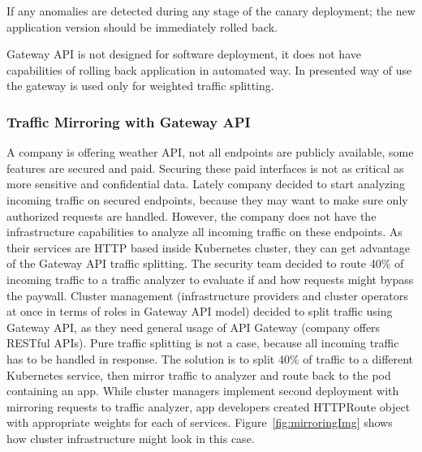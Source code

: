 If any anomalies are detected during any stage of the canary deployment; the new application version should be immediately rolled back.

Gateway API is not designed for software deployment, it does not have capabilities of rolling back application in automated way. In presented way of use the gateway is used only for weighted traffic splitting.


\subsubsection{Traffic Mirroring with Gateway API}
\label{subsubsection:mirroring}

A company is offering weather API, not all endpoints are publicly available, some features are secured and paid. Securing these paid interfaces is not as critical as more sensitive and confidential data. Lately company decided to start analyzing incoming traffic on secured endpoints, because they may want to make sure only authorized requests are handled. However, the company does not have the infrastructure capabilities to analyze all incoming traffic on these endpoints. As their services are HTTP based inside Kubernetes cluster, they can get advantage of the Gateway API traffic splitting. The security team decided to route 40\% of incoming traffic to a traffic analyzer to evaluate if and how requests might bypass the paywall. Cluster management (infrastructure providers and cluster operators at once in terms of roles in Gateway API model) decided to split traffic using Gateway API, as they need general usage of API Gateway (company offers RESTful APIs). Pure traffic splitting is not a case, because all incoming traffic has to be handled in response. The solution is to split 40\% of traffic to a different Kubernetes service, then mirror traffic to analyzer and route back to the pod containing an app. While cluster managers implement second deployment with mirroring requests to traffic analyzer, app developers created HTTPRoute object with appropriate weights for each of services. Figure~\ref{fig:mirroringImg} shows how cluster infrastructure might look in this case.


